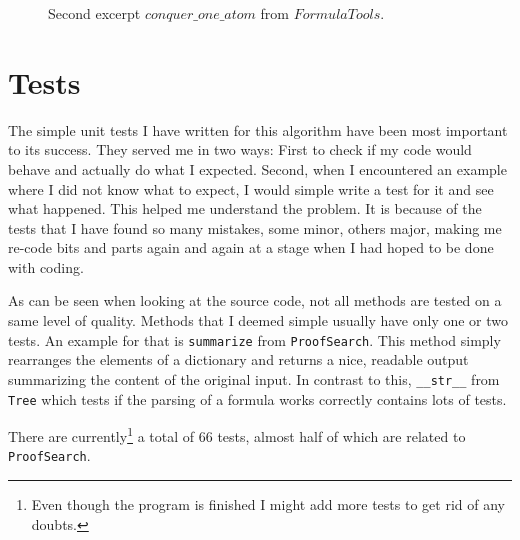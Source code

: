 \begin{figure}[H]
	\vspace{-10pt}
	
	\vspace{-10pt}
	\caption{Second excerpt $conquer\_one\_ atom$ from $FormulaTools$.}
\end{figure}

\bigskip


\section{Tests}
The simple unit tests I have written for this algorithm have been most important to its success. They served me in two ways: First to check if my code would behave and actually do what I expected. Second, when I encountered an example where I did not know what to expect, I would simple write a test for it and see what happened. This helped me understand the problem.
It is because of the tests that I have found so many mistakes, some minor, others major, making me re-code bits and parts again and again at a stage when I had hoped to be done with coding.

As can be seen when looking at the source code, not all methods are tested on a same level of quality. Methods that I deemed simple usually have only one or two tests. An example for that is \texttt{summarize} from \texttt{ProofSearch}. This method simply rearranges the elements of a dictionary and returns a nice, readable output summarizing the content of the original input. In contrast to this, \texttt{\_\_str\_\_} from \texttt{Tree} which tests if the parsing of a formula works correctly contains lots of tests.

There are currently\footnote{Even though the program is finished I might add more tests to get rid of any doubts.} a total of 66 tests, almost half of which are related to \texttt{ProofSearch}. 